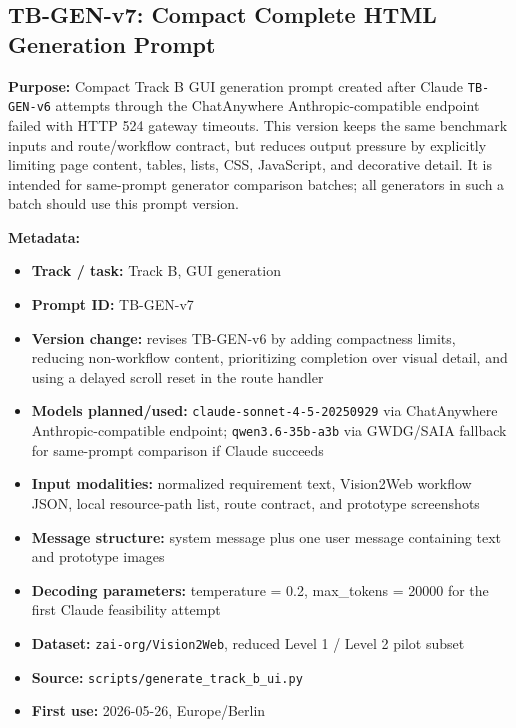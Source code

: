 \subsection{TB-GEN-v7: Compact Complete HTML Generation Prompt}
\label{app:prompt-tb-gen-v7}

\textbf{Purpose:} Compact Track B GUI generation prompt created after
Claude \texttt{TB-GEN-v6} attempts through the ChatAnywhere Anthropic-compatible
endpoint failed with HTTP 524 gateway timeouts. This version keeps the same
benchmark inputs and route/workflow contract, but reduces output pressure by
explicitly limiting page content, tables, lists, CSS, JavaScript, and decorative
detail. It is intended for same-prompt generator comparison batches; all
generators in such a batch should use this prompt version.

\textbf{Metadata:}
\begin{itemize}
  \item \textbf{Track / task:} Track B, GUI generation
  \item \textbf{Prompt ID:} TB-GEN-v7
  \item \textbf{Version change:} revises TB-GEN-v6 by adding compactness
  limits, reducing non-workflow content, prioritizing completion over visual
  detail, and using a delayed scroll reset in the route handler
  \item \textbf{Models planned/used:} \texttt{claude-sonnet-4-5-20250929}
  via ChatAnywhere Anthropic-compatible endpoint; \texttt{qwen3.6-35b-a3b}
  via GWDG/SAIA fallback for same-prompt comparison if Claude succeeds
  \item \textbf{Input modalities:} normalized requirement text, Vision2Web
  workflow JSON, local resource-path list, route contract, and prototype
  screenshots
  \item \textbf{Message structure:} system message plus one user message
  containing text and prototype images
  \item \textbf{Decoding parameters:} temperature = 0.2, max\_tokens = 20000
  for the first Claude feasibility attempt
  \item \textbf{Dataset:} \texttt{zai-org/Vision2Web}, reduced Level 1 /
  Level 2 pilot subset
  \item \textbf{Source:} \texttt{scripts/generate\_track\_b\_ui.py}
  \item \textbf{First use:} 2026-05-26, Europe/Berlin
\end{itemize}

